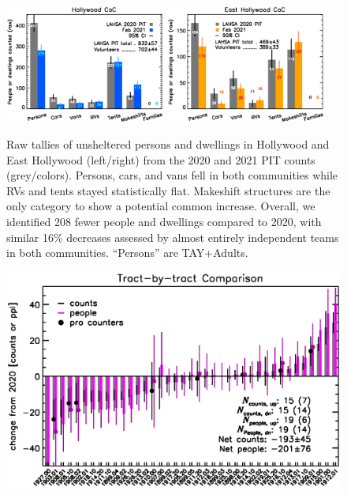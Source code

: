 \documentclass[11pt,twocolumn]{article}
\begin{document}
\begin{figure}[h]
	\centering
	\includegraphics[width = 0.47\textwidth, trim = 1cm 0cm 0cm 0cm]{Hwood2021Bars}
	\includegraphics[width = 0.47\textwidth, trim = 0cm 0cm 1cm 0cm]{Eho2021Bars}
	\caption{Raw tallies of unsheltered persons and dwellings in Hollywood and East Hollywood
			(left/right) from the 2020 and 2021 PIT counts (grey/colors). Persons, cars, 
			and vans fell in both communities while RVs and tents stayed statistically flat. 
			Makeshift structures are the only category to show a potential common increase. 
			Overall, we identified 208 fewer people and dwellings compared to 2020,
			with similar 16\% decreases assessed by almost entirely independent teams
			in both communities. ``Persons'' are TAY+Adults.}
	\label{fig:rawCounts}
\end{figure}

\begin{figure}[]
	\centering
	\includegraphics[width = \textwidth, trim = 0cm 0cm 0cm 0cm]{tractsYrYr}
	\caption{}
	\label{fig:tractYrYr}
\end{figure}
\end{document}
